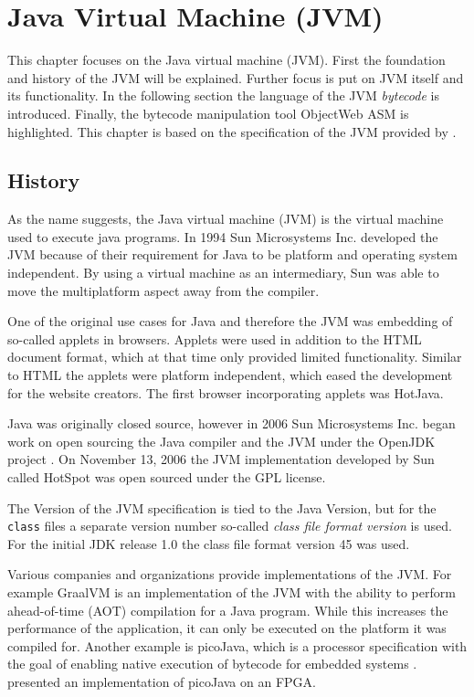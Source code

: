 \chapter{Java Virtual Machine (JVM)}

This chapter focuses on the Java virtual machine (JVM). First the foundation and history of the JVM will be explained. Further focus is put on JVM itself and its functionality. In the following section the language of the JVM \textit{bytecode} is introduced. Finally, the bytecode manipulation tool ObjectWeb ASM is highlighted. This chapter is based on the specification of the JVM provided by \textcite{JVMHistoryOracle}.

\section{History}

 As the name suggests, the Java virtual machine (JVM) is the virtual machine used to execute java programs. In 1994 Sun Microsystems Inc. developed the JVM because of their requirement for Java to be platform and operating system independent. By using a virtual machine as an intermediary, Sun was able to move the multiplatform aspect away from the compiler. 

One of the original use cases for Java and therefore the JVM was embedding of so-called applets in browsers. Applets were used in addition to the HTML document format, which at that time only provided limited functionality. Similar to HTML the applets were platform independent, which eased the development for the website creators. The first browser incorporating applets was HotJava. 

Java was originally closed source, however in 2006 Sun Microsystems Inc. began work on open sourcing the Java compiler and the JVM under the OpenJDK project \parencite{SunOpenSourceJava}. On November 13, 2006 the JVM implementation developed by Sun called HotSpot was open sourced under the GPL license.

The Version of the JVM specification is tied to the Java Version, but for the \texttt{class} files a separate version number so-called \textit{class file format version} is used. For the initial JDK release 1.0 the class file format version 45 was used. 

Various companies and organizations provide implementations of the JVM. For example GraalVM is an implementation of the JVM with the ability to perform ahead-of-time (AOT) compilation for a Java program. While this increases the performance of the application, it can only be executed on the platform it was compiled for. Another example is picoJava, which is a processor specification with the goal of enabling native execution of bytecode for embedded systems \parencite{PicoJava}. \textcite{PicoJavaFPGA} presented an implementation of picoJava on an FPGA.

